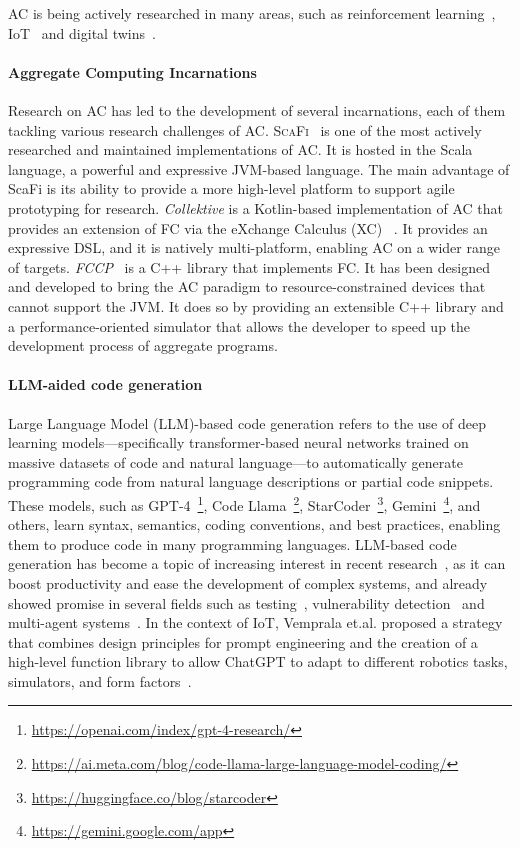 \documentclass[12pt]{article}
\begin{document}
AC is being actively researched in many areas, such as reinforcement learning~\cite{aguzzi2022towards}, IoT~\cite{beal2015aggregate} and digital twins~\cite{casadei2021digital}.

\paragraph{\textbf{Aggregate Computing Incarnations}} Research on AC has led to the development of several incarnations, each of them tackling various research challenges of AC.
\textsc{ScaFi}~\cite{casadei2016towards} is one of the most actively researched and maintained implementations of
AC. It is hosted in the Scala language, a powerful and expressive JVM-based language. The main advantage of ScaFi is its ability to provide a
more high-level platform to support agile prototyping for research. \textit{Collektive} is a Kotlin-based implementation of AC that provides an extension of FC via the eXchange Calculus (XC) ~\cite{audrito2024exchange}.
It provides an expressive DSL, and it is natively multi-platform, enabling AC on a wider range of targets.
\textit{FCCP}~\cite{audrito2024fcpp} is a C++ library that implements FC. It has been designed and developed to bring the AC paradigm to
resource-constrained devices that cannot support the JVM. It does so by providing an extensible C++ library and a performance-oriented simulator that allows
the developer to speed up the development process of aggregate programs. 

\paragraph{LLM-aided code generation}
\sloppypar
Large Language Model (LLM)-based code generation refers to the use of deep learning models—specifically transformer-based neural networks trained on massive datasets of code and natural language—to automatically generate
programming code from natural language descriptions or partial code snippets. These models, such as GPT-4~\footnote{\url{https://openai.com/index/gpt-4-research/}}, 
Code Llama~\footnote{\url{https://ai.meta.com/blog/code-llama-large-language-model-coding/}}, StarCoder~\footnote{\url{https://huggingface.co/blog/starcoder}}, Gemini~\footnote{\url{https://gemini.google.com/app}}, 
and others, learn syntax, semantics, coding conventions, and best practices, enabling them to produce
code in many programming languages.
LLM-based code generation has become a topic of increasing interest in recent research~\cite{wang2023review}, as it can boost productivity and ease the development of complex systems, and already showed promise in several fields such as
testing~\cite{hudson2024software}, vulnerability detection~\cite{zhou2025large} and multi-agent systems~\cite{he2025llm}.
In the context of IoT, Vemprala et.al. proposed a strategy that combines design principles for prompt engineering and the creation
of a high-level function library to allow ChatGPT to adapt to different robotics tasks, simulators, and form factors~\cite{vemprala2024chatgpt}.
\end{document}
